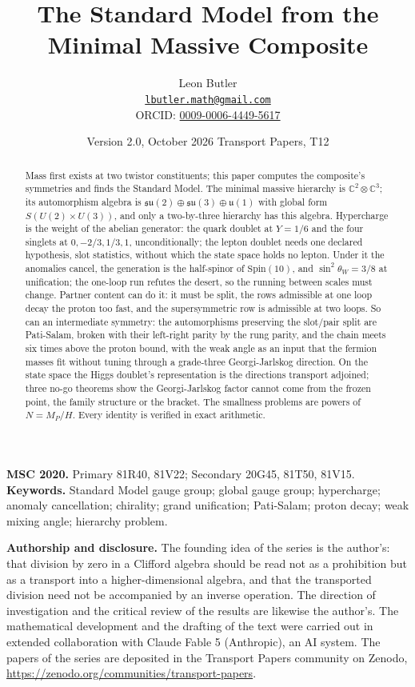 \documentclass[11pt]{article}
\title{\bfseries The Standard Model from the Minimal Massive Composite}
\author{Leon Butler\\ \normalsize\href{mailto:lbutler.math@gmail.com}{\texttt{lbutler.math@gmail.com}}\\ \normalsize ORCID: \href{https://orcid.org/0009-0006-4449-5617}{0009-0006-4449-5617}}
\date{Version 2.0, October 2026 \textperiodcentered{} Transport Papers, T12}
\theoremstyle{definition}
\newcommand{\C}{\mathbb{C}}
\newcommand{\su}{\mathfrak{su}}
\newcommand{\uu}{\mathfrak{u}}
\begin{document}
\maketitle

\begin{abstract}
\normalsize
Mass first exists at two twistor constituents; this paper computes the composite's symmetries and finds the Standard Model. The minimal massive hierarchy is $\C^{2} \otimes \C^{3}$; its automorphism algebra is $\su(2) \oplus \su(3) \oplus \uu(1)$ with global form $S(U(2) \times U(3))$, and only a two-by-three hierarchy has this algebra. Hypercharge is the weight of the abelian generator: the quark doublet at $Y = 1/6$ and the four singlets at $0, -2/3, 1/3, 1$, unconditionally; the lepton doublet needs one declared hypothesis, slot statistics, without which the state space holds no lepton. Under it the anomalies cancel, the generation is the half-spinor of $\mathrm{Spin}(10)$, and $\sin^{2}\theta_{W} = 3/8$ at unification; the one-loop run refutes the desert, so the running between scales must change. Partner content can do it: it must be split, the rows admissible at one loop decay the proton too fast, and the supersymmetric row is admissible at two loops. So can an intermediate symmetry: the automorphisms preserving the slot/pair split are Pati-Salam, broken with their left-right parity by the rung parity, and the chain meets six times above the proton bound, with the weak angle as an input that the fermion masses fit without tuning through a grade-three Georgi-Jarlskog direction. On the state space the Higgs doublet's representation is the directions transport adjoined; three no-go theorems show the Georgi-Jarlskog factor cannot come from the frozen point, the family structure or the bracket. The smallness problems are powers of $N = M_{P}/H$. Every identity is verified in exact arithmetic.
\end{abstract}

\medskip
\noindent\textbf{MSC 2020.} Primary 81R40, 81V22; Secondary 20G45, 81T50, 81V15.\\
\textbf{Keywords.} Standard Model gauge group; global gauge group; hypercharge; anomaly cancellation; chirality; grand unification; Pati-Salam; proton decay; weak mixing angle; hierarchy problem.

\newpage
\textbf{Authorship and disclosure. }The founding idea of the series is the author's: that division by zero in a Clifford algebra should be read not as a prohibition but as a transport into a higher-dimensional algebra, and that the transported division need not be accompanied by an inverse operation. The direction of investigation and the critical review of the results are likewise the author's. The mathematical development and the drafting of the text were carried out in extended collaboration with Claude Fable 5 (Anthropic), an AI system. The papers of the series are deposited in the Transport Papers community on Zenodo, \url{https://zenodo.org/communities/transport-papers}.
\end{document}
